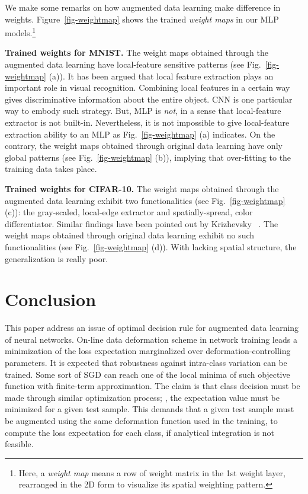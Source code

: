 \documentclass[10pt,twocolumn,letterpaper]{article}
\begin{document}
We make some remarks on how augmented data learning make difference in weights.
Figure~\ref{fig-weightmap} shows the trained {\it weight maps}
in our MLP models.\footnote{Here, a {\it weight map} means a row of weight matrix in the 1st weight layer, 
rearranged in the 2D form
to visualize its spatial weighting pattern.}

{\bf Trained weights for MNIST.}
The weight maps obtained through the augmented data learning have local-feature sensitive patterns
(see Fig.~\ref{fig-weightmap} (a)).
It has been argued that local feature extraction plays an important role
in visual recognition.
Combining local features in a certain way gives discriminative information about the entire object.
CNN is one particular way to embody such strategy.
But, MLP is {\it not}, in a sense that local-feature extractor is not built-in.
Nevertheless, it is not impossible to give local-feature extraction ability to an MLP
as Fig.~\ref{fig-weightmap} (a) indicates.
On the contrary, the weight maps obtained through original data learning have only global patterns 
(see Fig.~\ref{fig-weightmap} (b)), implying that over-fitting to the training data takes place.


{\bf Trained weights for CIFAR-10.}
The weight maps obtained through the augmented data learning exhibit two functionalities (see Fig.~\ref{fig-weightmap} (c)):
the gray-scaled, local-edge extractor and spatially-spread, color differentiator.
Similar findings have been pointed out by Krizhevsky \etal~\cite{NIPS2012_4824}.
The weight maps obtained through original data learning exhibit no such functionalities
(see Fig.~\ref{fig-weightmap} (d)).
With lacking spatial structure, the generalization is really poor.


\section{Conclusion}

This paper address an issue of optimal decision rule for augmented data learning of neural networks.
On-line data deformation scheme in network training 
leads a minimization of the loss expectation marginalized over deformation-controlling parameters.
It is expected that robustness against intra-class variation can be trained.
Some sort of SGD can reach one of the local minima of such objective function with finite-term approximation.
The claim is that class decision must be made through similar optimization process;
\ie, the expectation value must be minimized for a given test sample.
This demands that a given test sample must be augmented using the same deformation function used in the training,
to compute the loss expectation for each class, if analytical integration is not feasible.
\end{document}
